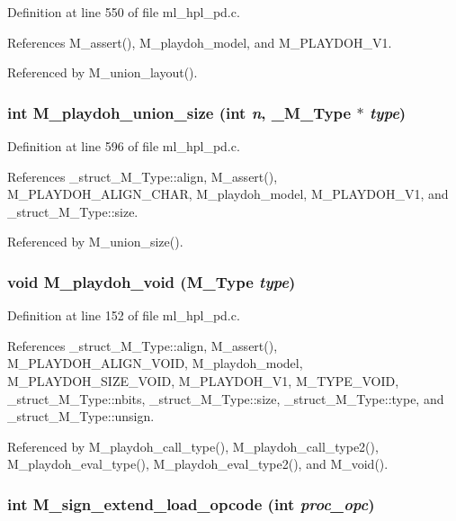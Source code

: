 Definition at line 550 of file ml\_\-hpl\_\-pd.c.

References M\_\-assert(), M\_\-playdoh\_\-model, and M\_\-PLAYDOH\_\-V1.

Referenced by M\_\-union\_\-layout().
\subsubsection{\setlength{\rightskip}{0pt plus 5cm}int M\_\-playdoh\_\-union\_\-size (int {\em n}, \bf{\_\-M\_\-Type} $\ast$ {\em type})}\label{ml__hpl__pd_8c_eb6ad20ac50f223bff7c4ff468181281}




Definition at line 596 of file ml\_\-hpl\_\-pd.c.

References \_\-struct\_\-M\_\-Type::align, M\_\-assert(), M\_\-PLAYDOH\_\-ALIGN\_\-CHAR, M\_\-playdoh\_\-model, M\_\-PLAYDOH\_\-V1, and \_\-struct\_\-M\_\-Type::size.

Referenced by M\_\-union\_\-size().
\subsubsection{\setlength{\rightskip}{0pt plus 5cm}void M\_\-playdoh\_\-void (\bf{M\_\-Type} {\em type})}\label{ml__hpl__pd_8c_e56cc2373c61771191400d794129f728}




Definition at line 152 of file ml\_\-hpl\_\-pd.c.

References \_\-struct\_\-M\_\-Type::align, M\_\-assert(), M\_\-PLAYDOH\_\-ALIGN\_\-VOID, M\_\-playdoh\_\-model, M\_\-PLAYDOH\_\-SIZE\_\-VOID, M\_\-PLAYDOH\_\-V1, M\_\-TYPE\_\-VOID, \_\-struct\_\-M\_\-Type::nbits, \_\-struct\_\-M\_\-Type::size, \_\-struct\_\-M\_\-Type::type, and \_\-struct\_\-M\_\-Type::unsign.

Referenced by M\_\-playdoh\_\-call\_\-type(), M\_\-playdoh\_\-call\_\-type2(), M\_\-playdoh\_\-eval\_\-type(), M\_\-playdoh\_\-eval\_\-type2(), and M\_\-void().
\subsubsection{\setlength{\rightskip}{0pt plus 5cm}int M\_\-sign\_\-extend\_\-load\_\-opcode (int {\em proc\_\-opc})}\label{ml__hpl__pd_8c_5b7e38eee945ef7a9fd5408225a88cbd}




